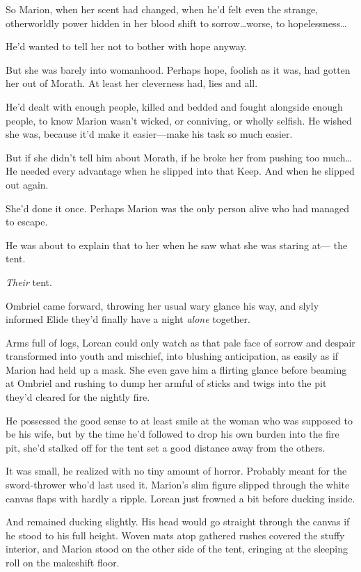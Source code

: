 So Marion, when her scent had changed, when he'd felt even the strange, otherworldly power hidden in her blood shift to sorrow\ldots worse, to hopelessness\ldots{}

He'd wanted to tell her not to bother with hope anyway.

But she was barely into womanhood.
Perhaps hope, foolish as it was, had gotten her out of Morath.
At least her cleverness had, lies and all.

He'd dealt with enough people, killed and bedded and fought alongside enough people, to know Marion wasn't wicked, or conniving, or wholly selfish.
He wished she was, because it'd make it easier---make his task so much easier.

But if she didn't tell him about Morath, if he broke her from pushing too much\ldots He needed every advantage when he slipped into that Keep.
And when he slipped out again.

She'd done it once.
Perhaps Marion was the only person alive who had managed to escape.

He was about to explain that to her when he saw what she was staring at--- the tent.

\emph{Their} tent.

Ombriel came forward, throwing her usual wary glance his way, and slyly informed Elide they'd finally have a night \emph{alone} together.

Arms full of logs, Lorcan could only watch as that pale face of sorrow and despair transformed into youth and mischief, into blushing anticipation, as easily as if Marion had held up a mask.
She even gave him a flirting glance before beaming at Ombriel and rushing to dump her armful of sticks and twigs into the pit they'd cleared for the nightly fire.

He possessed the good sense to at least smile at the woman who was supposed to be his wife, but by the time he'd followed to drop his own burden into the fire pit, she'd stalked off for the tent set a good distance away from the others.

It was small, he realized with no tiny amount of horror.
Probably meant for the sword-thrower who'd last used it.
Marion's slim figure slipped through the white canvas flaps with hardly a ripple.
Lorcan just frowned a bit before ducking inside.

And remained ducking slightly.
His head would go straight through the canvas if he stood to his full height.
Woven mats atop gathered rushes covered the stuffy interior, and Marion stood on the other side of the tent, cringing at the sleeping roll on the makeshift floor.

